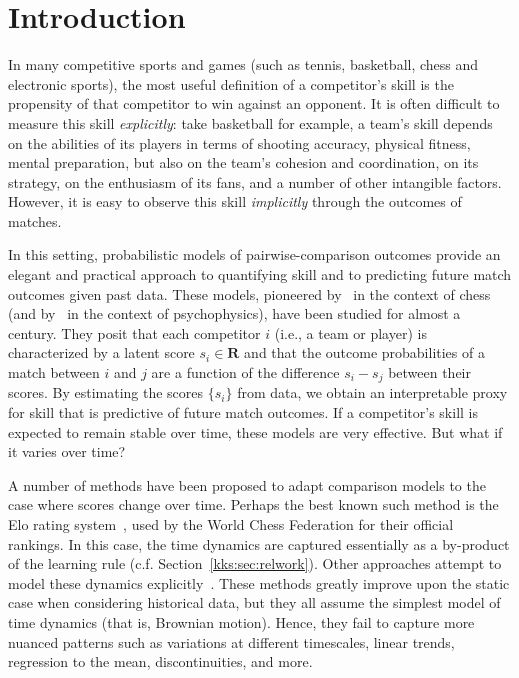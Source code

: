 \section{Introduction}
\label{kks:sec:intro}

In many competitive sports and games (such as tennis, basketball, chess and electronic sports), the most useful definition of a competitor's skill is the propensity of that competitor to win against an opponent.
It is often difficult to measure this skill \emph{explicitly}:
take basketball for example, a team's skill depends on the abilities of its players in terms of shooting accuracy, physical fitness, mental preparation, but also on the team's cohesion and coordination, on its strategy, on the enthusiasm of its fans, and a number of other intangible factors.
However, it is easy to observe this skill \emph{implicitly} through the outcomes of matches.

In this setting, probabilistic models of pairwise-comparison outcomes provide an elegant and practical approach to quantifying skill and to predicting future match outcomes given past data.
These models, pioneered by~\citet{zermelo1928berechnung} in the context of chess (and by~\citet{thurstone1927law} in the context of psychophysics), have been studied for almost a century.
They posit that each competitor $i$ (i.e., a team or player) is characterized by a latent score $s_i \in \mathbf{R}$ and that the outcome probabilities of a match between $i$ and $j$ are a function of the difference $s_i - s_j$ between their scores.
By estimating the scores $\{ s_i \}$ from data, we obtain an interpretable proxy for skill that is predictive of future match outcomes.
If a competitor's skill is expected to remain stable over time, these models are very effective.
But what if it varies over time?

A number of methods have been proposed to adapt comparison models to the case where scores change over time.
Perhaps the best known such method is the Elo rating system~\citep{elo1978rating}, used by the World Chess Federation for their official rankings.
In this case, the time dynamics are captured essentially as a by-product of the learning rule (c.f. Section~\ref{kks:sec:relwork}).
Other approaches attempt to model these dynamics explicitly~\citep{fahrmeir1994dynamic, glickman1999parameter, dangauthier2007trueskill, coulom2008whole}.
These methods greatly improve upon the static case when considering historical data, but they all assume the simplest model of time dynamics (that is, Brownian motion).
Hence, they fail to capture more nuanced patterns such as variations at different timescales, linear trends, regression to the mean, discontinuities, and more.


